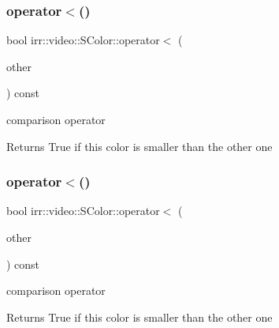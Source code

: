 \subsubsection{\texorpdfstring{operator$<$()}{operator<()}\hspace{0.1cm}{\footnotesize\ttfamily [1/2]}}
{\footnotesize\ttfamily bool irr\+::video\+::\+S\+Color\+::operator$<$ (\begin{DoxyParamCaption}\item[{const \hyperlink{classirr_1_1video_1_1SColor}{S\+Color} \&}]{other }\end{DoxyParamCaption}) const\hspace{0.3cm}{\ttfamily [inline]}}



comparison operator 

\begin{DoxyReturn}{Returns}
True if this color is smaller than the other one 
\end{DoxyReturn}
\mbox{\label{classirr_1_1video_1_1SColor_adf45f90ff13a1eb56b5784a3fba20247}} 
\subsubsection{\texorpdfstring{operator$<$()}{operator<()}\hspace{0.1cm}{\footnotesize\ttfamily [2/2]}}
{\footnotesize\ttfamily bool irr\+::video\+::\+S\+Color\+::operator$<$ (\begin{DoxyParamCaption}\item[{const \hyperlink{classirr_1_1video_1_1SColor}{S\+Color} \&}]{other }\end{DoxyParamCaption}) const\hspace{0.3cm}{\ttfamily [inline]}}



comparison operator 

\begin{DoxyReturn}{Returns}
True if this color is smaller than the other one 
\end{DoxyReturn}
\mbox{\label{classirr_1_1video_1_1SColor_a7042c0433d4b89e6473e9f123f6b35d0}} 
